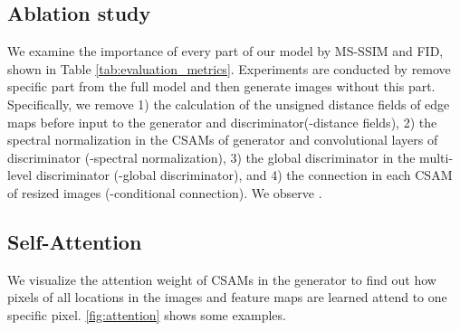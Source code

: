 \subsection{Ablation study}
We examine the importance of every part of our model by MS-SSIM and FID, shown in Table \ref{tab:evaluation_metrics}. Experiments are conducted by remove specific part from the full model and then generate images without this part. Specifically, we remove 1) the calculation of the unsigned distance fields of edge maps before input to the generator and discriminator(-distance fields), 2) the spectral normalization in the CSAMs of generator and convolutional layers of discriminator (-spectral normalization), 3) the global discriminator in the multi-level discriminator (-global discriminator), and 4) the connection in each CSAM of resized images (-conditional connection). We observe .
%
\subsection{Self-Attention}
We visualize the attention weight of CSAMs in the generator to find out how pixels of all locations in the images and feature maps are learned attend to one specific pixel.  \ref{fig:attention} shows some examples.
%

%